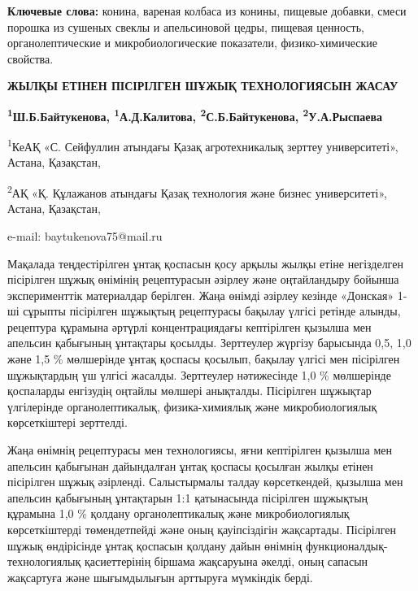 {\bfseries Ключевые слова:} конина, вареная колбаса из конины, пищевые
добавки, смеси порошка из сушеных свеклы и апельсиновой цедры, пищевая
ценность, органолептические и микробиологические показатели,
физико-химические свойства.

\begin{articleheader}
{\bfseries ЖЫЛҚЫ ЕТІНЕН ПІСІРІЛГЕН ШҰЖЫҚ ТЕХНОЛОГИЯСЫН ЖАСАУ}

{\bfseries
\textsuperscript{1}Ш.Б.Байтукенова\textsuperscript{\envelope },
\textsuperscript{1}А.Д.Калитова,
\textsuperscript{2}С.Б.Байтукенова,
\textsuperscript{2}У.А.Рыспаева
}
\end{articleheader}

\begin{affiliation}
\textsuperscript{1}КеАҚ «С. Сейфуллин атындағы Қазақ агротехникалық
зерттеу университеті», Астана, Қазақстан,

\textsuperscript{2}АҚ «Қ. Құлажанов атындағы Қазақ технология және
бизнес университеті», Астана, Қазақстан,

e-mail: baytukenova75@mail.ru
\end{affiliation}

Мақалада теңдестірілген ұнтақ қоспасын қосу арқылы жылқы етіне
негізделген пісірілген шұжық өнімінің рецептурасын әзірлеу және
оңтайландыру бойынша эксперименттік материалдар берілген. Жаңа өнімді
әзірлеу кезінде «Донская» 1-ші сұрыпты пісірілген шұжықтың рецептурасы
бақылау үлгісі ретінде алынды, рецептура құрамына әртүрлі
концентрациядағы кептірілген қызылша мен апельсин қабығының ұнтақтары
қосылды. Зерттеулер жүргізу барысында 0,5, 1,0 және 1,5 \% мөлшерінде
ұнтақ қоспасы қосылып, бақылау үлгісі мен пісірілген шұжықтардың үш
үлгісі жасалды. Зерттеулер нәтижесінде 1,0 \% мөлшерінде қоспаларды
енгізудің оңтайлы мөлшері анықталды. Пісірілген шұжықтар үлгілерінде
органолептикалық, физика-химиялық және микробиологиялық көрсеткіштері
зерттелді.

Жаңа өнімнің рецептурасы мен технологиясы, яғни кептірілген қызылша мен
апельсин қабығынан дайындалған ұнтақ қоспасы қосылған жылқы етінен
пісірілген шұжық әзірленді. Салыстырмалы талдау көрсеткендей, қызылша
мен апельсин қабығының ұнтақтарын 1:1 қатынасында пісірілген шұжықтың
құрамына 1,0 \% қолдану органолептикалық және микробиологиялық
көрсеткіштерді төмендетпейді және оның қауіпсіздігін жақсартады.
Пісірілген шұжық өндірісінде ұнтақ қоспасын қолдану дайын өнімнің
функционалдық-технологиялық қасиеттерінің біршама жақсаруына әкелді,
оның сапасын жақсартуға және шығымдылығын арттыруға мүмкіндік берді.


